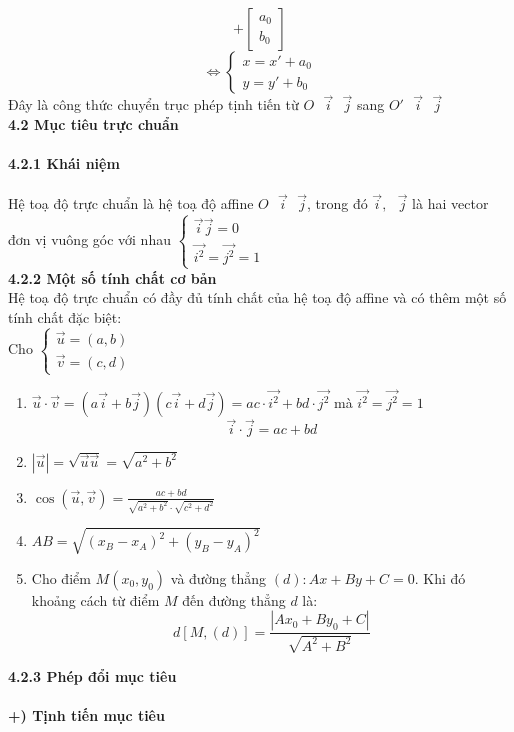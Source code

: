 \documentclass[12pt,a4]{article}
\begin{document}
\begin{titlepage}
\[        +
        \begin{bmatrix}
        a_0\\
        b_0
        \end{bmatrix}
    \]
    \[
    \Leftrightarrow \begin{cases}
            x = x' + a_0\\
            y = y' + b_0
        \end{cases}
    \]
    Đây là công thức chuyển trục phép tịnh tiến từ $O\textbf{ }\vec{i}\textbf{ }\vec{j}$ sang $O'\textbf{ }\vec{i}\textbf{ }\vec{j}$\\
    \textbf{4.2 Mục tiêu trực chuẩn}\\
    \vspace{0.2cm}\\
    \textbf{4.2.1 Khái niệm}\\
    \vspace{0.2cm}\\
    Hệ toạ độ trực chuẩn là hệ toạ độ affine $O\textbf{ }\vec{i}\textbf{ }\vec{j}$, trong đó $\vec{i},\textbf{ } \vec{j}$ là hai vector đơn vị vuông góc với nhau $\begin{cases} \vec{i} \vec{j} = 0\\ \vec{i^2} = \vec{j^2} = 1 \end{cases}$\\
    \textbf{4.2.2 Một số tính chất cơ bản}\\
    Hệ toạ độ trực chuẩn có đầy đủ tính chất của hệ toạ độ affine và có thêm một số tính chất đặc biệt:\\
    Cho $\begin{cases} \vec{u} = (a,b)\\ \vec{v} = (c,d)\end{cases}$\\
    \begin{enumerate}
        \item $\vec{u} \cdot \vec{v} = (a\vec{i} + b\vec{j})(c\vec{i} + d\vec{j}) = ac\cdot\vec{i^2} + bd \cdot\vec{j^2} $ mà $\vec{i^2} = \vec{j^2} = 1$
        \[
        \boxed{\vec{i} \cdot \vec{j} = ac + bd}
        \]
        \item $|\vec{u}| = \sqrt{\vec{u} \vec{u}} = \sqrt{a^2 + b^2}$
        \item $\cos(\vec{u},\vec{v}) = \frac{ac + bd}{\sqrt{a^2 + b^2}\cdot\sqrt{c^2 + d^2}}$
        \item $AB = \sqrt{(x_B - x_A)^2 + (y_B - y_A)^2}$
        \item Cho điểm $M(x_0,y_0)$ và đường thẳng $(d): Ax+By+C=0.$ Khi đó khoảng cách từ điểm $M$ đến đường thẳng $d$ là:
        \[
            d[M,(d)] = \frac{|Ax_0 + By_0 + C|}{\sqrt{A^2 + B^2}}
        \]
    \end{enumerate}
    \textbf{4.2.3 Phép đổi mục tiêu}\\
    \vspace{0.2cm}\\
    \textbf{+) Tịnh tiến mục tiêu}\\
    \vspace{0.2cm}
    \begin{center}
    \begin{tikzpicture}[scale=2]


\end{tikzpicture}
\end{center}
\end{titlepage}
\end{document}
